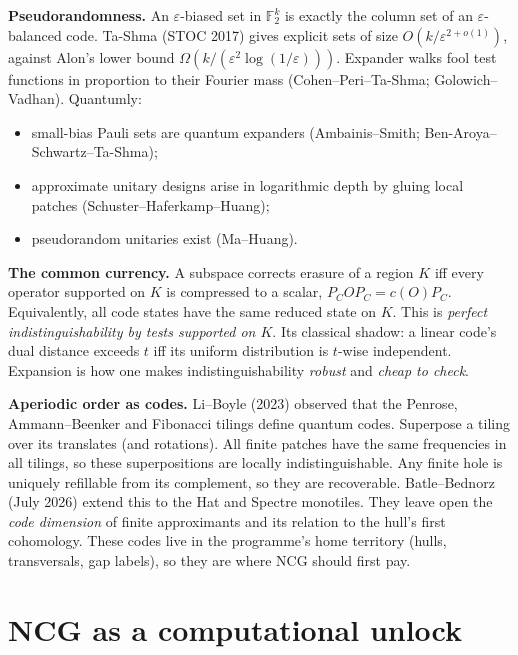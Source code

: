 \documentclass[11pt]{article}
\theoremstyle{definition}
\theoremstyle{remark}
\newcommand{\F}{\mathbb F}
\begin{document}
\textbf{Pseudorandomness.} An $\varepsilon$-biased set in $\F_2^k$ is exactly the column set of an $\varepsilon$-balanced code. Ta-Shma (STOC 2017) gives explicit sets of size $O(k/\varepsilon^{2+o(1)})$, against Alon's lower bound $\Omega(k/(\varepsilon^2\log(1/\varepsilon)))$. Expander walks fool test functions in proportion to their Fourier mass (Cohen--Peri--Ta-Shma; Golowich--Vadhan). Quantumly:
\begin{itemize}
\item small-bias Pauli sets are quantum expanders (Ambainis--Smith; Ben-Aroya--Schwartz--Ta-Shma);
\item approximate unitary designs arise in logarithmic depth by gluing local patches (Schuster--Haferkamp--Huang);
\item pseudorandom unitaries exist (Ma--Huang).
\end{itemize}

\textbf{The common currency.} A subspace corrects erasure of a region $K$ iff every operator supported on $K$ is compressed to a scalar, $P_COP_C=c(O)P_C$. Equivalently, all code states have the same reduced state on $K$. This is \emph{perfect indistinguishability by tests supported on $K$}. Its classical shadow: a linear code's dual distance exceeds $t$ iff its uniform distribution is $t$-wise independent. Expansion is how one makes indistinguishability \emph{robust} and \emph{cheap to check}.

\textbf{Aperiodic order as codes.} Li--Boyle (2023) observed that the Penrose, Ammann--Beenker and Fibonacci tilings define quantum codes. Superpose a tiling over its translates (and rotations). All finite patches have the same frequencies in all tilings, so these superpositions are locally indistinguishable. Any finite hole is uniquely refillable from its complement, so they are recoverable. Batle--Bednorz (July 2026) extend this to the Hat and Spectre monotiles. They leave open the \emph{code dimension} of finite approximants and its relation to the hull's first cohomology. These codes live in the programme's home territory (hulls, transversals, gap labels), so they are where NCG should first pay.

\section{NCG as a computational unlock}
\end{document}
